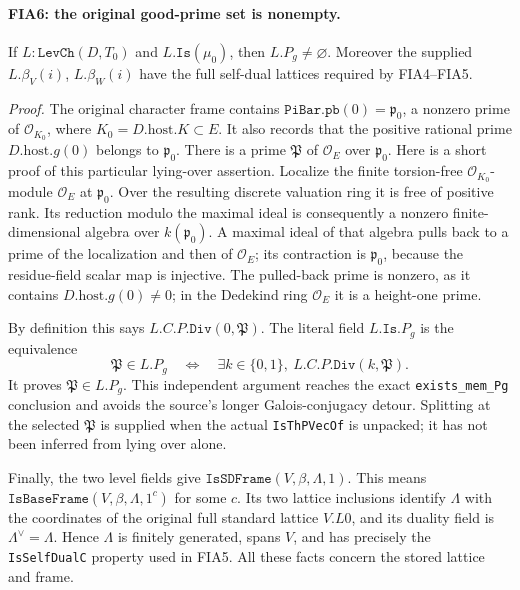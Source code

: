 \paragraph{FIA6: the original good-prime set is nonempty.}
\label{claim:FIA6}
If \(L:\texttt{LevCh}(D,T_0)\) and \(L.\texttt{Is}(\mu_0)\),
then \(L.P_g\ne\varnothing\).  Moreover the supplied
\(L.\beta_V(i)\), \(L.\beta_W(i)\) have the full self-dual
lattices required by FIA4--FIA5.

\emph{Proof.}
The original character frame contains
\(\texttt{PiBar.pb}(0)=\mathfrak p_0\), a nonzero prime of
\(\mathcal O_{K_0}\), where
\(K_0=D.\mathrm{host}.K\subset E\).
It also records that the positive rational prime
\(D.\mathrm{host}.g(0)\) belongs to \(\mathfrak p_0\).
There is a prime \(\mathfrak P\) of \(\mathcal O_E\) over
\(\mathfrak p_0\).  Here is a short proof of this particular
lying-over assertion.  Localize the finite torsion-free
\(\mathcal O_{K_0}\)-module \(\mathcal O_E\) at
\(\mathfrak p_0\).  Over the resulting discrete valuation
ring it is free of positive rank.  Its reduction modulo
the maximal ideal is consequently a nonzero finite-dimensional
algebra over \(k(\mathfrak p_0)\).  A maximal ideal of that
algebra pulls back to a prime of the localization and then
of \(\mathcal O_E\); its contraction is \(\mathfrak p_0\),
because the residue-field scalar map is injective.
The pulled-back prime is nonzero, as it contains
\(D.\mathrm{host}.g(0)\ne0\); in the Dedekind ring
\(\mathcal O_E\) it is a height-one prime.

By definition this says \(L.C.P.\texttt{Div}(0,\mathfrak P)\).
The literal field \(L.\texttt{Is}.P_g\) is the equivalence
\[
       \mathfrak P\in L.P_g
          \quad\Longleftrightarrow\quad
       \exists k\in\{0,1\},\ L.C.P.\texttt{Div}(k,\mathfrak P).
 \tag{FIA.32}
\]
It proves \(\mathfrak P\in L.P_g\).
This independent argument reaches the exact
\texttt{exists\_mem\_Pg} conclusion and avoids the source's
longer Galois-conjugacy detour.
Splitting at the selected \(\mathfrak P\) is supplied when
the actual \texttt{IsThPVecOf} is unpacked; it has not
been inferred from lying over alone.

Finally, the two level fields give
\(\texttt{IsSDFrame}(V,\beta,\Lambda,1)\).
This means \(\texttt{IsBaseFrame}(V,\beta,\Lambda,1^c)\)
for some \(c\).  Its two lattice inclusions identify
\(\Lambda\) with the coordinates of the original full
standard lattice \(V.L0\), and its duality field is
\(\Lambda^\vee=\Lambda\).  Hence \(\Lambda\) is finitely
generated, spans \(V\), and has precisely the
\texttt{IsSelfDualC} property used in FIA5.
All these facts concern the stored lattice and frame.

